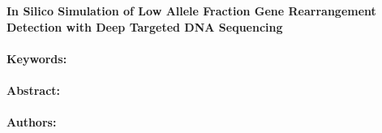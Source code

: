 \noindent
\large {\bf In Silico Simulation of Low Allele Fraction Gene Rearrangement Detection with Deep Targeted DNA Sequencing} 


\normalsize 


\noindent \paragraph{Keywords:} 

\noindent \paragraph{Abstract:} 



\noindent \paragraph{Authors:} 

